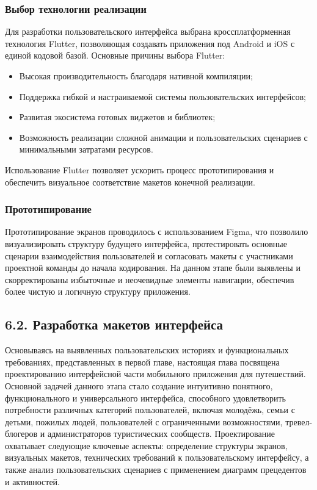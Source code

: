 \subsubsection*{Выбор технологии реализации}
Для разработки пользовательского интерфейса выбрана кроссплатформенная технология Flutter, позволяющая создавать приложения под Android и iOS с единой кодовой базой. Основные причины выбора Flutter:
\begin{itemize}
    \item Высокая производительность благодаря нативной компиляции;
    \item Поддержка гибкой и настраиваемой системы пользовательских интерфейсов;
    \item Развитая экосистема готовых виджетов и библиотек;
    \item Возможность реализации сложной анимации и пользовательских сценариев с минимальными затратами ресурсов.
\end{itemize}
Использование Flutter позволяет ускорить процесс прототипирования и обеспечить визуальное соответствие макетов конечной реализации.

\subsubsection*{Прототипирование}
Прототипирование экранов проводилось с использованием Figma, что позволило визуализировать структуру будущего интерфейса, протестировать основные сценарии взаимодействия пользователей и согласовать макеты с участниками проектной команды до начала кодирования. На данном этапе были выявлены и скорректированы избыточные и неочевидные элементы навигации, обеспечив более чистую и логичную структуру приложения.

\subsection*{6.2. Разработка макетов интерфейса}
Основываясь на выявленных пользовательских историях и функциональных требованиях, представленных в первой главе, настоящая глава посвящена проектированию интерфейсной части мобильного приложения для путешествий. Основной задачей данного этапа стало создание интуитивно понятного, функционального и универсального интерфейса, способного удовлетворить потребности различных категорий пользователей, включая молодёжь, семьи с детьми, пожилых людей, пользователей с ограниченными возможностями, тревел-блогеров и администраторов туристических сообществ.
Проектирование охватывает следующие ключевые аспекты: определение структуры экранов, визуальных макетов, технических требований к пользовательскому интерфейсу, а также анализ пользовательских сценариев с применением диаграмм прецедентов и активностей.

